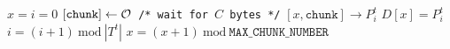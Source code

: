 \documentclass{article}
\begin{document}
\pagestyle{empty}

\newcommand{\send}{\Rightarrow}
\newcommand{\sendto}{\rightarrow}
\newcommand{\recv}{\Leftarrow}
\algrenewcommand{}

\begin{algorithmic}

  \State $x=i=0$
  \State $[\mathtt{chunk}] \gets {\cal O}$~\texttt{/* wait for $C$ bytes */}
  \State $[x,\mathtt{chunk}] \sendto P^t_i$
  \State $D[x]=P^t_i$
  \State $i=(i+1)~\text{mod}~|T^t|$
  \State $x=(x+1)~\text{mod}~\mathtt{MAX\_CHUNK\_NUMBER}$
  \EndWhile
  \EndProcedure
  
\end{algorithmic}
\end{document}
